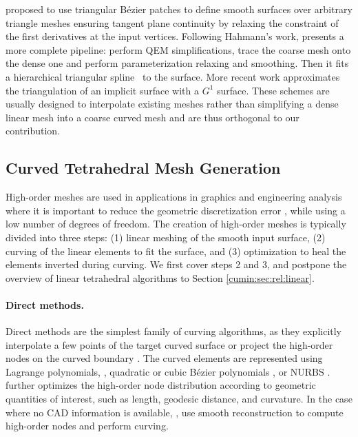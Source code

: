 \cite{Hahmann2003} proposed to use triangular B{\'e}zier patches to define smooth surfaces over arbitrary triangle meshes ensuring tangent plane continuity by relaxing the constraint of the first derivatives at the input vertices.
%
Following Hahmann's work, \cite{yvart2005smooth} presents a more complete pipeline: perform QEM simplifications, trace the coarse mesh onto the dense one and perform parameterization relaxing and smoothing. Then it fits a hierarchical triangular spline~\cite{Yvart2005hier} to the surface.
%
More recent work \cite{TONG2009} approximates the triangulation of an implicit surface with a $G^1$ surface.
%
These schemes are usually designed to interpolate existing meshes rather than simplifying a dense linear mesh into a coarse curved mesh and are thus orthogonal to our contribution.

\subsection{Curved Tetrahedral Mesh Generation}

High-order meshes are used in applications in graphics \cite{bargteil2014animation,MEZGER2009680,Suwelack2013} and engineering analysis \cite{Jameson2002} where it is important to reduce the geometric discretization error \cite{Babuska1988,BABUSKA1992159,BASSI1997251,luo2001influence,ODEN1994309}, while using a low number of degrees of freedom. The creation of high-order meshes is typically divided into three steps: (1) linear meshing of the smooth input surface, (2) curving of the linear elements to fit the surface, and (3) optimization to heal the elements inverted during curving. We first cover steps 2 and 3, and postpone the overview of linear tetrahedral algorithms to Section \ref{cumin:sec:rel:linear}.

\paragraph{Direct methods.} Direct methods are the simplest family of curving algorithms, as they explicitly interpolate a few points of the target curved surface or project the high-order nodes on the curved boundary  \cite{dey1999curvilinear,Ghasemi2016,MOXEY2015636,abgrall2012,sherwin2002mesh,turner2017high,marcon2019semi}. The curved elements are represented using Lagrange polynomials, \cite{dey1999curvilinear,Peir2008}, quadratic or cubic B{\'e}zier polynomials \cite{George2012,Qiukai2013,Luo2002pVersionMG}, or NURBS \cite{ENGVALL2016378,ENGVALL201783}. \cite{SHEPHARD2005251,sherwin2002mesh} further optimizes the high-order node distribution according to geometric quantities of interest, such as length, geodesic distance, and curvature. 
In the case where no CAD information is available, \cite{wang2016construction}, \cite{jiao2012reconstructing} use smooth reconstruction to compute high-order nodes and perform curving.

